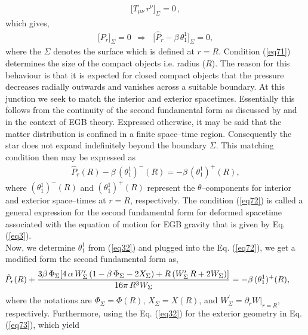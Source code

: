 \documentclass[]{aastex631}
\begin{document}
\begin{eqnarray}
\big[T_{\mu\nu}\,r^{\nu}\big]_{\Sigma}=0\, ,\label{eq70}
\end{eqnarray}
which gives,
\begin{eqnarray}
\big[P_r\big]_{\Sigma}=0~~\Longrightarrow~~\,\big[\hat{P}_r-\beta\,\theta^1_1\big]_{\Sigma}=0,\label{eq71}
\end{eqnarray}
where the $\Sigma$ denotes the surface which is defined at $r=R$. Condition (\ref{eq71}) determines the size of the compact objects i.e. radius ($R$). 
The reason for this behaviour is that it is expected for closed compact objects that the pressure decreases radially outwards and vanishes across a suitable boundary. At this junction we seek to match the interior and exterior spacetimes. Essentially this follows from the continuity of the second fundamental form as discussed by \cite{davis} and \cite{gravanis} in the context of EGB theory. Expressed otherwise, it may be said that the  matter distribution is confined in a finite space--time region. Consequently the star does not expand indefinitely beyond the boundary  $\Sigma$. This matching condition then may be expressed as
\begin{eqnarray}
\hat{P}_r(R)-\beta\,(\theta^1_1)^{-}(R)=-\beta\,(\theta^1_1)^{+}(R), \label{eq72}
\end{eqnarray}
where $(\theta^1_1)^{-}(R)$ and $(\theta^1_1)^{+}(R)$ represent the $\theta$--components for interior and exterior space--times at $r=R$, respectively. The condition (\ref{eq72}) is called a general expression for the second fundamental form for deformed spacetime  associated with the equation of motion for EGB gravity that is given by Eq. (\ref{eq3}).\\
Now, we determine $\theta^1_1$ from (\ref{eq32}) and plugged into the Eq. (\ref{eq72}), we get a modified form the second fundamental form as, 
\begin{eqnarray}
&&\hspace{-0.8cm} \hat{P}_r(R)+\frac{3 \beta\,\Phi_{\Sigma} [4 \,\alpha\, W_{\Sigma}^\prime\, (1 - \beta\, \Phi_{\Sigma} -2 X_{\Sigma}) + R\, (W_{\Sigma}^\prime\, R + 2 W_{\Sigma})]}{16 \pi\,R^3 W_{\Sigma}}=-\beta\,(\theta^1_1)^{+}(R),~~ \label{eq73}
\end{eqnarray}
where the notations are $\Phi_{\Sigma} = \Phi(R)$, $X_{\Sigma}=X(R)$, and $W^\prime_{\Sigma}={\partial_r W}\big|_{r=R}$, respectively. 
Furthermore, using the Eq. (\ref{eq32}) for
the exterior geometry in Eq. (\ref{eq73}), which  yield
\end{document}
